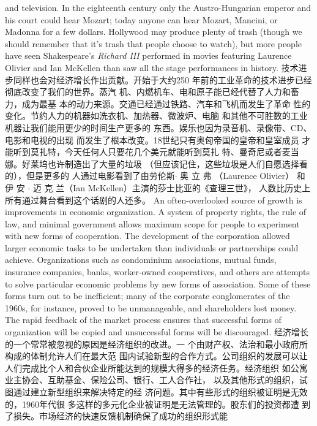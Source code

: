 \begin{paracol}{2}
and television. In the eighteenth century only the Austro-Hungarian emperor and his court could hear Mozart; today anyone
can hear Mozart, Mancini, or Madonna for a few dollars. Hollywood may produce plenty of trash (though we should remember that it's trash that people choose to watch), but more people
have seen Shakespeare's \textit{Richard III} performed in movies featuring Laurence Olivier and Ian McKellen than saw all the stage
performances in history.
\switchcolumn
技术进步同样也会对经济增长作出贡献。开始于大约250
年前的工业革命的技术进步已经彻底改变了我们的世界。蒸汽
机、内燃机车、电和原子能已经代替了人力和畜力，成为最基
本的动力来源。交通已经通过铁路、汽车和飞机而发生了革命
性的变化。节约人力的机器如洗衣机、加热器、微波炉、电脑
和其他不可胜数的工业机器让我们能用更少的时间生产更多的
东西。娱乐也因为录音机、录像带、CD、电影和电视的出现
而发生了根本改变。18世纪只有奥匈帝国的皇帝和皇室成员
才能听到莫扎特，今天任何人只要花几个美元就能听到莫扎
特、曼奇尼或者麦当娜。好莱坞也许制造出了大量的垃圾
（但应该记住，这些垃圾是人们自愿选择看的），但是更多的
人通过电影看到了由劳伦斯$\cdot$ 奥 立 弗 （Laurence  Olivier） 和伊
安 $\cdot$ 迈 克 兰（Ian McKellen）主演的莎士比亚的《查理三世》，
人数比历史上所有通过舞台看到这个话剧的人还多。
\switchcolumn*
An often-overlooked source of growth is improvements in
economic organization. A system of property rights, the rule of
law, and minimal government allows maximum scope for people to experiment with new forms of cooperation. The development of the corporation allowed larger economic tasks to be
undertaken than individuals or partnerships could achieve. Organizations such as condominium associations, mutual funds,
insurance companies, banks, worker-owned cooperatives, and
others are attempts to solve particular economic problems by
new forms of association. Some of these forms turn out to be inefficient; many of the corporate conglomerates of the 1960s, for
instance, proved to be unmanageable, and shareholders lost
money. The rapid feedback of the market process ensures that
successful forms of organization will be copied and unsuccessful
forms will be discouraged.
\switchcolumn
经济增长的一个常常被忽视的原因是经济组织的改进。一
个由财产权、法治和最小政府所构成的体制允许人们在最大范
围内试验新型的合作方式。公司组织的发展可以让人们完成比个人和合伙企业所能达到的规模大得多的经济任务。经济组织
如公寓业主协会、互助基金、保险公司、银行、工人合作社，
以及其他形式的组织，试图通过建立新型组织来解决特定的经
济问题。其中有些形式的组织被证明是无效的，1960年代很
多这样的多元化企业被证明是无法管理的。股东们的投资都遭
到了损失。市场经济的快速反馈机制确保了成功的组织形式能

\end{paracol}
